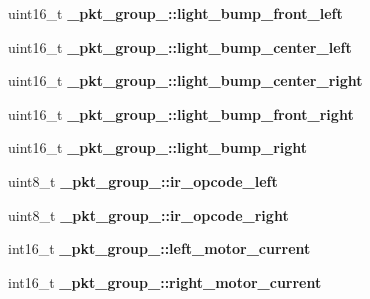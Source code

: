 \begin{DoxyCompactItemize}
\item 
\hypertarget{group__roomba-lib_ga30567925e0f9765463335c092f83229c}{}uint16\+\_\+t {\bfseries \+\_\+pkt\+\_\+group\+\_\+::light\+\_\+bump\+\_\+front\+\_\+left}\label{group__roomba-lib_ga30567925e0f9765463335c092f83229c}

\item 
\hypertarget{group__roomba-lib_gaeeb1ac2f38084972135c8cc8ddb9b245}{}uint16\+\_\+t {\bfseries \+\_\+pkt\+\_\+group\+\_\+::light\+\_\+bump\+\_\+center\+\_\+left}\label{group__roomba-lib_gaeeb1ac2f38084972135c8cc8ddb9b245}

\item 
\hypertarget{group__roomba-lib_ga82e8b7ec16d40c7eb6a44a692ec9223b}{}uint16\+\_\+t {\bfseries \+\_\+pkt\+\_\+group\+\_\+::light\+\_\+bump\+\_\+center\+\_\+right}\label{group__roomba-lib_ga82e8b7ec16d40c7eb6a44a692ec9223b}

\item 
\hypertarget{group__roomba-lib_ga60db7aefc4a621e07174101743d3e62e}{}uint16\+\_\+t {\bfseries \+\_\+pkt\+\_\+group\+\_\+::light\+\_\+bump\+\_\+front\+\_\+right}\label{group__roomba-lib_ga60db7aefc4a621e07174101743d3e62e}

\item 
\hypertarget{group__roomba-lib_gab1f0b337b13492bf416a392bdd94bb54}{}uint16\+\_\+t {\bfseries \+\_\+pkt\+\_\+group\+\_\+::light\+\_\+bump\+\_\+right}\label{group__roomba-lib_gab1f0b337b13492bf416a392bdd94bb54}

\item 
\hypertarget{group__roomba-lib_gacc8eade26f0b95c21fda66fe62cb50a6}{}uint8\+\_\+t {\bfseries \+\_\+pkt\+\_\+group\+\_\+::ir\+\_\+opcode\+\_\+left}\label{group__roomba-lib_gacc8eade26f0b95c21fda66fe62cb50a6}

\item 
\hypertarget{group__roomba-lib_ga36fd48407b82b248741b666060dcb6df}{}uint8\+\_\+t {\bfseries \+\_\+pkt\+\_\+group\+\_\+::ir\+\_\+opcode\+\_\+right}\label{group__roomba-lib_ga36fd48407b82b248741b666060dcb6df}

\item 
\hypertarget{group__roomba-lib_gace8a74734805c0951ae53fa3e828f555}{}int16\+\_\+t {\bfseries \+\_\+pkt\+\_\+group\+\_\+::left\+\_\+motor\+\_\+current}\label{group__roomba-lib_gace8a74734805c0951ae53fa3e828f555}

\item 
\hypertarget{group__roomba-lib_ga3b91ad760130be2525877771cf8fc6ff}{}int16\+\_\+t {\bfseries \+\_\+pkt\+\_\+group\+\_\+::right\+\_\+motor\+\_\+current}\label{group__roomba-lib_ga3b91ad760130be2525877771cf8fc6ff}


\end{DoxyCompactItemize}
